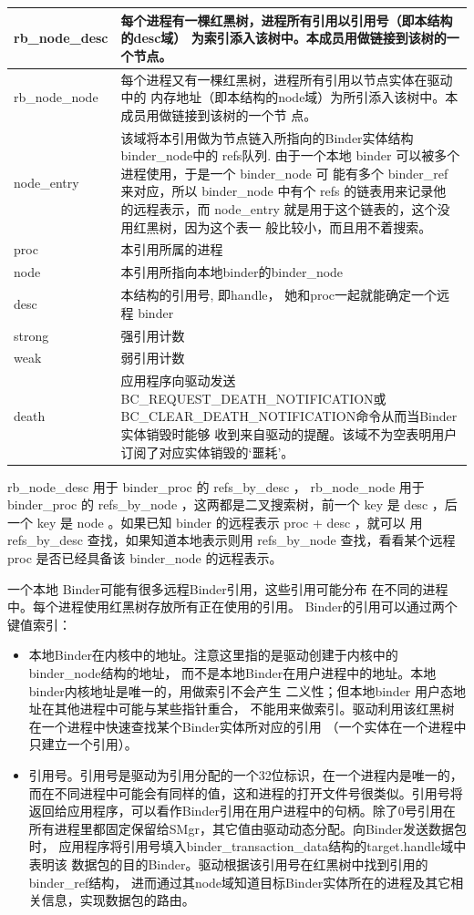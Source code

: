\documentclass[a4paper,11pt]{article}
\begin{document}
\begin{longtable}{|p{}|p{}|}\hline
    rb_node_desc & 每个进程有一棵红黑树，进程所有引用以引用号（即本结构的desc域）
    为索引添入该树中。本成员用做链接到该树的一个节点。\\\hline
    rb_node_node & 每个进程又有一棵红黑树，进程所有引用以节点实体在驱动中的
    内存地址（即本结构的node域）为所引添入该树中。本成员用做链接到该树的一个节
    点。\\\hline
    node_entry & 该域将本引用做为节点链入所指向的Binder实体结构binder_node中的
    refs队列.  由于一个本地 binder 可以被多个进程使用，于是一个 binder_node 可
    能有多个 binder_ref 来对应，所以 binder_node 中有个 refs 的链表用来记录他
    的远程表示，而 node_entry 就是用于这个链表的，这个没用红黑树，因为这个表一
    般比较小，而且用不着搜索。 \\\hline
    proc & 本引用所属的进程 \\\hline
    node & 本引用所指向本地binder的binder_node\\\hline
    desc & 本结构的引用号, 即handle， 她和proc一起就能确定一个远程 binder \\\hline
    strong & 强引用计数 \\\hline
    weak & 弱引用计数 \\\hline
    death & 应用程序向驱动发送BC_REQUEST_DEATH_NOTIFICATION或
    BC_CLEAR_DEATH_NOTIFICATION命令从而当Binder实体销毁时能够
    收到来自驱动的提醒。该域不为空表明用户订阅了对应实体销毁的‘噩耗’。\\\hline
\end{longtable}
rb_node_desc 用于 binder_proc 的 refs_by_desc ，
rb_node_node 用于 binder_proc 的 refs_by_node ，这两都是二叉搜索树，前一个 key
是 desc ，后一个 key 是 node 。如果已知 binder 的远程表示 proc + desc ，就可以
用 refs_by_desc 查找，如果知道本地表示则用 refs_by_node 查找，看看某个远程
proc 是否已经具备该 binder_node 的远程表示。

一个本地 Binder可能有很多远程Binder引用，这些引用可能分布
在不同的进程中。每个进程使用红黑树存放所有正在使用的引用。
Binder的引用可以通过两个键值索引：
\begin{itemize}
\item  本地Binder在内核中的地址。注意这里指的是驱动创建于内核中的binder_node结构的地址，
    而不是本地Binder在用户进程中的地址。本地binder内核地址是唯一的，用做索引不会产生
    二义性；但本地binder 用户态地址在其他进程中可能与某些指针重合，
    不能用来做索引。驱动利用该红黑树在一个进程中快速查找某个Binder实体所对应的引用
    （一个实体在一个进程中只建立一个引用）。
\item 引用号。引用号是驱动为引用分配的一个32位标识，在一个进程内是唯一的，
    而在不同进程中可能会有同样的值，这和进程的打开文件号很类似。引用号将
    返回给应用程序，可以看作Binder引用在用户进程中的句柄。除了0号引用在
    所有进程里都固定保留给SMgr，其它值由驱动动态分配。向Binder发送数据包时，
    应用程序将引用号填入binder_transaction_data结构的target.handle域中表明该
    数据包的目的Binder。驱动根据该引用号在红黑树中找到引用的binder_ref结构，
    进而通过其node域知道目标Binder实体所在的进程及其它相关信息，实现数据包的路由。

\end{itemize}
\end{document}
